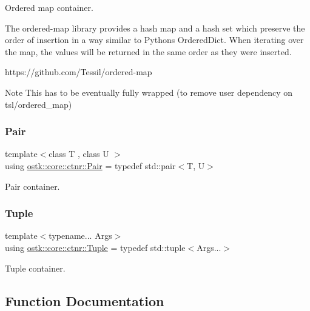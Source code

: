 Ordered map container. 

The ordered-\/map library provides a hash map and a hash set which preserve the order of insertion in a way similar to Python\textquotesingle{}s Ordered\+Dict. When iterating over the map, the values will be returned in the same order as they were inserted.

https\+://github.com/\+Tessil/ordered-\/map \begin{DoxyNote}{Note}
This has to be eventually fully wrapped (to remove user dependency on tsl/ordered\+\_\+map) 
\end{DoxyNote}
\mbox{\label{namespaceostk_1_1core_1_1ctnr_a08e64f04352e3c432bff0cfd3b23923b}} 
\subsubsection{\texorpdfstring{Pair}{Pair}}
{\footnotesize\ttfamily template$<$class T , class U $>$ \\
using \hyperlink{namespaceostk_1_1core_1_1ctnr_a08e64f04352e3c432bff0cfd3b23923b}{ostk\+::core\+::ctnr\+::\+Pair} = typedef std\+::pair$<$T, U$>$}



Pair container. 

\mbox{\label{namespaceostk_1_1core_1_1ctnr_a7f01ca040222e5b0c02a90aa68cc8e88}} 
\subsubsection{\texorpdfstring{Tuple}{Tuple}}
{\footnotesize\ttfamily template$<$typename... Args$>$ \\
using \hyperlink{namespaceostk_1_1core_1_1ctnr_a7f01ca040222e5b0c02a90aa68cc8e88}{ostk\+::core\+::ctnr\+::\+Tuple} = typedef std\+::tuple$<$Args...$>$}



Tuple container. 



\subsection{Function Documentation}
\mbox{\label{namespaceostk_1_1core_1_1ctnr_ae073c65f208c5d6ff9cfdb026ded7fea}} 

